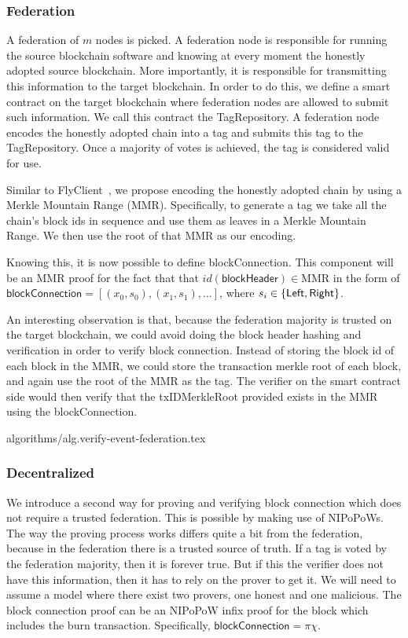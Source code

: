 \subsubsection{Federation}
A federation of $m$ nodes is picked. A federation node is responsible for running the source blockchain software and knowing at every moment the honestly adopted source blockchain. More importantly, it is responsible for transmitting this information to the target blockchain. In order to do this, we define a smart contract on the target blockchain where federation nodes are allowed to submit such information. We call this contract the \textsf{TagRepository}. A federation node encodes the honestly adopted chain into a tag and submits this tag to the \textsf{TagRepository}. Once a majority of votes is achieved, the tag is considered valid for use.

Similar to FlyClient~\cite{flyclient}, we propose encoding the honestly adopted chain by using a Merkle Mountain Range (MMR). Specifically, to generate a tag we take all the chain's block ids in sequence and use them as leaves in a Merkle Mountain Range. We then use the root of that MMR as our encoding.

Knowing this, it is now possible to define \textsf{blockConnection}. This component will be an MMR proof for the fact that that $id(\mathsf{blockHeader}) \in \text{MMR}$ in the form of $\mathsf{blockConnection} = [(x_0, s_0), (x_1, s_1), \dots]$, where $s_i \in \sf\{Left, Right\}$.

An interesting observation is that, because the federation majority is trusted on the target blockchain, we could avoid doing the block header hashing and verification in order to verify block connection. Instead of storing the block id of each block in the MMR, we could store the transaction merkle root of each block, and again use the root of the MMR as the tag. The verifier on the smart contract side would then verify that the \textsf{txIDMerkleRoot} provided exists in the MMR using the \textsf{blockConnection}.

{algorithms/alg.verify-event-federation.tex}

\subsubsection{Decentralized}
We introduce a second way for proving and verifying block connection which does not require a trusted federation. This is possible by making use of NIPoPoWs. The way the proving process works differs quite a bit from the federation, because in the federation there is a trusted source of truth. If a tag is voted by the federation majority, then it is forever true. But if this the verifier does not have this information, then it has to rely on the prover to get it. We will need to assume a model where there exist two provers, one honest and one malicious. The block connection proof can be an NIPoPoW infix proof for the block which includes the burn transaction. Specifically, $\mathsf{blockConnection} = \pi\chi$.

